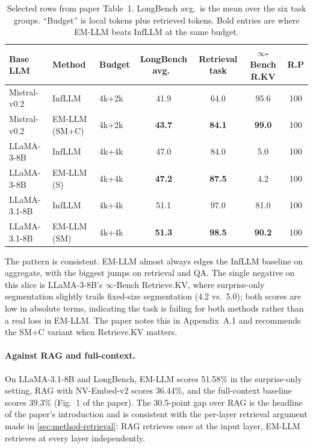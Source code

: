 \begin{table}[h]
\centering
\footnotesize
\begin{tabular}{lllcccc}
  \toprule
  Base LLM & Method & Budget & LongBench avg.\ & Retrieval task & $\infty$-Bench R.KV & R.P \\
  \midrule
  Mistral-v0.2 & InfLLM & 4k+2k & 41.9 & 64.0 & 95.6 & 100 \\
  Mistral-v0.2 & EM-LLM (SM+C) & 4k+2k & \textbf{43.7} & \textbf{84.1} & \textbf{99.0} & 100 \\
  \midrule
  LLaMA-3-8B & InfLLM & 4k+4k & 47.0 & 84.0 & 5.0 & 100 \\
  LLaMA-3-8B & EM-LLM (S) & 4k+4k & \textbf{47.2} & \textbf{87.5} & 4.2 & 100 \\
  \midrule
  LLaMA-3.1-8B & InfLLM & 4k+4k & 51.1 & 97.0 & 81.0 & 100 \\
  LLaMA-3.1-8B & EM-LLM (SM) & 4k+4k & \textbf{51.3} & \textbf{98.5} & \textbf{90.2} & 100 \\
  \bottomrule
\end{tabular}
\caption{Selected rows from paper Table~1. LongBench avg.\ is the mean over the six task groups. ``Budget'' is local tokens plus retrieved tokens. Bold entries are where EM-LLM beats InfLLM at the same budget.}
\label{tab:headline}
\end{table}

The pattern is consistent. EM-LLM almost always edges the InfLLM baseline on aggregate, with the biggest jumps on retrieval and QA. The single negative on this slice is LLaMA-3-8B's $\infty$-Bench Retrieve.KV, where surprise-only segmentation slightly trails fixed-size segmentation (4.2 vs.\ 5.0); both scores are low in absolute terms, indicating the task is failing for both methods rather than a real loss in EM-LLM. The paper notes this in Appendix~A.1 and recommends the SM+C variant when Retrieve.KV matters.

\paragraph{Against RAG and full-context.}
On LLaMA-3.1-8B and LongBench, EM-LLM scores 51.58\% in the surprise-only setting, RAG with NV-Embed-v2 scores 36.44\%, and the full-context baseline scores 39.3\% (Fig.~1 of the paper). The 30.5-point gap over RAG is the headline of the paper's introduction and is consistent with the per-layer retrieval argument made in \cref{sec:method-retrieval}: RAG retrieves once at the input layer, EM-LLM retrieves at every layer independently.

